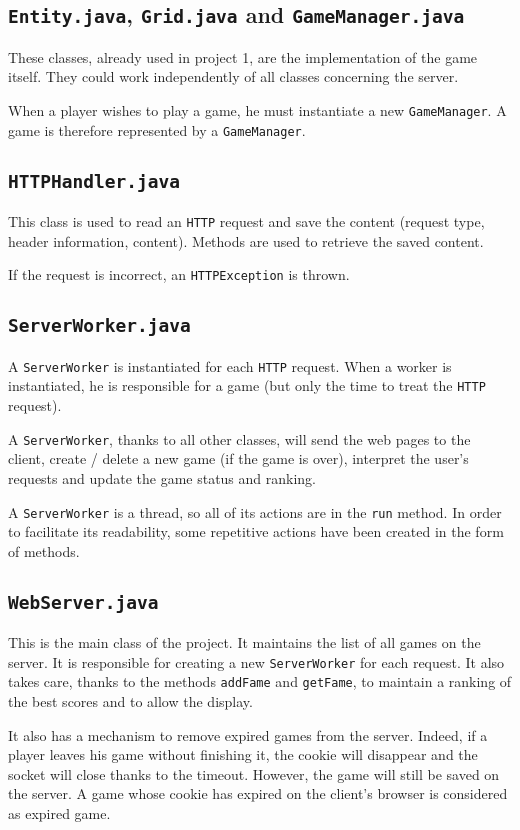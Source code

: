 \documentclass[a4paper, 12pt]{article}
\begin{document}
	\subsection{\texttt{Entity.java}, \texttt{Grid.java} and \texttt{GameManager.java}}
	These classes, already used in project 1, are the implementation of the game itself. They could work independently of all classes concerning the server.\par
	When a player wishes to play a game, he must instantiate a new \texttt{GameManager}. A game is therefore represented by a \texttt{GameManager}.
	\subsection{\texttt{HTTPHandler.java}}
	This class is used to read an \texttt{HTTP} request and save the content (request type, header information, content). Methods are used to retrieve the saved content.\par
	If the request is incorrect, an \texttt{HTTPException} is thrown.
	\subsection{\texttt{ServerWorker.java}}
	A \texttt{ServerWorker} is instantiated for each \texttt{HTTP} request. When a worker is instantiated, he is responsible for a game (but only the time to treat the \texttt{HTTP} request).\par
	A \texttt{ServerWorker}, thanks to all other classes, will send the web pages to the client, create / delete a new game (if the game is over), interpret the user's requests and update the game status and ranking.\par
	A \texttt{ServerWorker} is a thread, so all of its actions are in the \texttt{run} method. In order to facilitate its readability, some repetitive actions have been created in the form of methods.
	\subsection{\texttt{WebServer.java}}
	This is the main class of the project. It maintains the list of all games on the server. It is responsible for creating a new \texttt{ServerWorker} for each request. It also takes care, thanks to the methods \texttt{addFame} and \texttt{getFame}, to maintain a ranking of the best scores and to allow the display.\par
	It also has a mechanism to remove expired games from the server. Indeed, if a player leaves his game without finishing it, the cookie will disappear and the socket will close thanks to the timeout. However, the game will still be saved on the server. A game whose cookie has expired on the client's browser is considered as \og expired game\fg{}.
\end{document}
